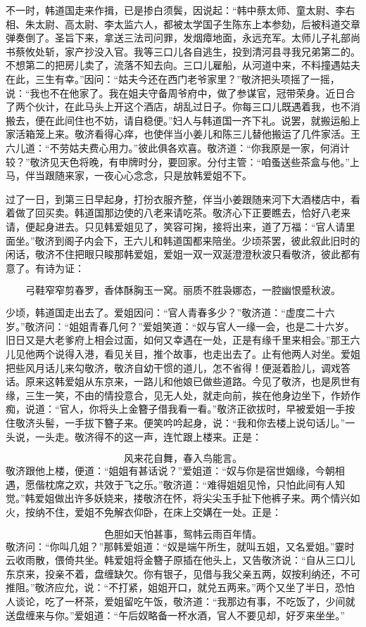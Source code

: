 不一时，韩道国走来作揖，已是掺白须鬓，因说起：“韩中蔡太师、童太尉、李右相、朱太尉、高太尉、李太监六人，都被太学国子生陈东上本参劾，后被科道交章弹奏倒了。圣旨下来，拿送三法司问罪，发烟瘴地面，永远充军。太师儿子礼部尚书蔡攸处斩，家产抄没入官。我等三口儿各自逃生，投到清河县寻我兄弟第二的。不想第二的把房儿卖了，流落不知去向。三口儿雇船，从河道中来，不料撞遇姑夫在此，三生有幸。”因问：“姑夫今还在西门老爷家里？”敬济把头项摇了一摇，说：“我也不在他家了。我在姐夫守备周爷府中，做了参谋官，冠带荣身。近日合了两个伙计，在此马头上开这个酒店，胡乱过日子。你每三口儿既遇着我，也不消搬去，便在此间住也不妨，请自稳便。”妇人与韩道国一齐下礼。说罢，就搬运船上家活箱笼上来。敬济看得心痒，也使伴当小姜儿和陈三儿替他搬运了几件家活。王六儿道：“不劳姑夫费心用力。”彼此俱各欢喜。敬济道：“你我原是一家，何消计较？”敬济见天色将晚，有申牌时分，要回家。分付主管：“咱蚤送些茶盒与他。”上马，伴当跟随来家，一夜心心念念，只是放韩爱姐不下。

过了一日，到第三日早起身，打扮衣服齐整，伴当小姜跟随来河下大酒楼店中，看着做了回买卖。韩道国那边使的八老来请吃茶。敬济心下正要瞧去，恰好八老来请，便起身进去。只见韩爱姐见了，笑容可掬，接将出来，道了万福：“官人请里面坐。”敬济到阁子内会下，王六儿和韩道国都来陪坐。少顷茶罢，彼此叙此旧时的闲话，敬济不住把眼只睃那韩爱姐，爱姐一双一双涎澄澄秋波只看敬济，彼此都有意了。有诗为证：

\[
弓鞋窄窄剪春罗，香体酥胸玉一窝。
丽质不胜袅娜态，一腔幽恨蹙秋波。
\]

少顷，韩道国走出去了。爱姐因问：“官人青春多少？”敬济道：“虚度二十六岁。”敬济问：“姐姐青春几何？”爱姐笑道：“奴与官人一缘一会，也是二十六岁。旧日又是大老爹府上相会过面，如何又幸遇在一处，正是有缘千里来相会。”那王六儿见他两个说得入港，看见关目，推个故事，也走出去了。止有他两人对坐。爱姐把些风月话儿来勾敬济，敬济自幼干惯的道儿，怎不省得！便涎着脸儿，调戏答话。原来这韩爱姐从东京来，一路儿和他娘已做些道路。今见了敬济，也是夙世有缘，三生一笑，不由的情投意合，见无人处，就走向前，挨在他身边坐下，作娇作痴，说道：“官人，你将头上金簪子借我看一看。”敬济正欲拔时，早被爱姐一手按住敬济头髻，一手拔下簪子来。便笑吟吟起身，说：“我和你去楼上说句话儿。”一头说，一头走。敬济得不的这一声，连忙跟上楼来。正是：

\[
风来花自舞，春入鸟能言。
\]
敬济跟他上楼，便道：“姐姐有甚话说？”爱姐道：“奴与你是宿世姻缘，今朝相遇，愿偕枕席之欢，共效于飞之乐。”敬济道：“难得姐姐见怜，只怕此间有人知觉。”韩爱姐做出许多妖娆来，搂敬济在怀，将尖尖玉手扯下他裤子来。两个情兴如火，按纳不住，爱姐不免解衣仰卧，在床上交媾在一处。正是：

\[
色胆如天怕甚事，鸳帏云雨百年情。
\]
敬济问：“你叫几姐？”那韩爱姐道：“奴是端午所生，就叫五姐，又名爱姐。”霎时云收雨散，偎倚共坐。韩爱姐将金簪子原插在他头上，又告敬济说：“自从三口儿东京来，投亲不着，盘缠缺欠。你有银子，见借与我父亲五两，奴按利纳还，不可推阻。”敬济应允，说：“不打紧，姐姐开口，就兑五两来。”两个又坐了半日，恐怕人谈论，吃了一杯茶，爱姐留吃午饭，敬济道：“我那边有事，不吃饭了，少间就送盘缠来与你。”爱姐道：“午后奴略备一杯水酒，官人不要见却，好歹来坐坐。”

